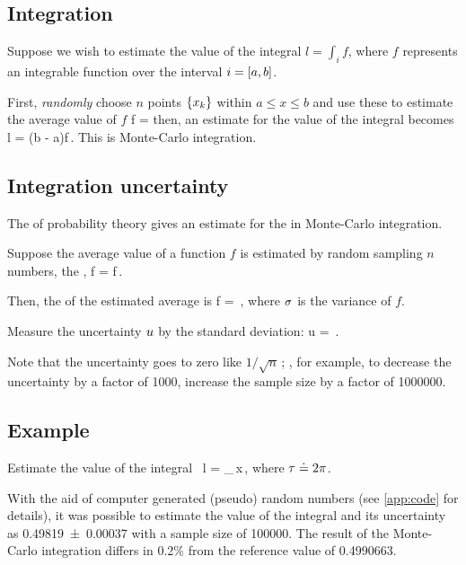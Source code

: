 \subsection*{Integration}
%
Suppose we wish to estimate the value of the integral $l = \int_i f$, where $f$ represents an integrable function over the interval $i = \left[{a},{b}\right]$.

First, \emph{randomly} choose $n$ points $\left\lbrace{x_k}\right\rbrace$ within $a\leq x\leq b$ and use these to estimate the average value of $f$
%
\beq
  \mean f = 
\eeq
%
then, an estimate for the value of the integral becomes
%
\beq
  l = \left(b - a\right)\mean f\,.
\eeq
%
This is Monte-Carlo integration.


\subsection*{Integration uncertainty}
%
The  of probability theory gives an estimate for the  in Monte-Carlo integration. 

Suppose the average value of a function $f$ is estimated by random sampling $n$ numbers, \aka the ,
%
\beq
  \mean f =  f\,.
\eeq

Then, the  of the estimated average is
%
\beq
  \var\mean f = \,,
\eeq
%
where $\sigma$ is the variance of $f$.

Measure the uncertainty $u$ by the standard deviation:
%
\beq
  u = \,.
\eeq

Note that the uncertainty goes to zero like $1/\sqrt{n}$\,; \ie, for example, to decrease the uncertainty by a factor of 1000, increase the sample size by a factor of 1000000.


\subsection*{Example}
%
Estimate the value of the integral~
%
\beq
  l = \int_{}\exp{}\sin{}\,\dx x\,,
\eeq
%
where $\tau\doteq 2\pi$.

With the aid of computer generated (pseudo) random numbers (see \cref{app:code} for details), it was possible to estimate the value of the integral and its uncertainty as \num{0.49819 +- 0.00037} with a sample size of \num{100000}. The result of the Monte-Carlo integration differs in 0.2\% from the reference value of \num{0.4990663}.

